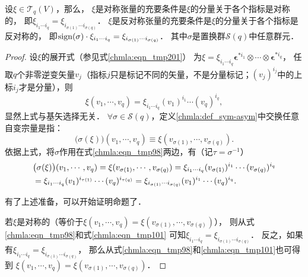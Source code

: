 \begin{proposition}\label{chmla:thm_component-sym-asym}
    设$\xi \in \mathcal{T}_q(V)$，那么，
    $\xi$是对称张量的充要条件是$\xi$的分量关于各个指标是对称的，
    即$\xi_{i_1\cdots i_q}=\xi_{i_{\sigma(1)}\cdots i_{\sigma(q)}}$．
    $\xi$是反对称张量的充要条件是$\xi$的分量关于各个指标是反对称的，
    即${\rm sign}(\sigma) \cdot \xi_{i_1\cdots i_q}= \xi_{i_{\sigma(1)}\cdots i_{\sigma(q)}}$．
    其中$\sigma$是置换群$\mathscr{S}(q)$中任意群元．
\end{proposition}
\begin{proof}
    设$\xi$的展开式（参见式\eqref{chmla:eqn_tmp201}）
    为$\xi = \xi_{i_1 \cdots i_q} \boldsymbol{\epsilon}^{*i_1} \otimes\cdots\otimes \boldsymbol{\epsilon}^{*i_q}$，
    任取$q$个非零逆变矢量$v_j$（指标$j$只是标记不同的矢量，不是分量标记；$(v_j)^{i_j}$中的上标$i_j$才是分量），则
    \begin{equation}\label{chmla:eqn_tmp98}
        \xi(v_1,\cdots,v_q)= \xi_{i_1 \cdots i_q} (v_1)^{i_1}\cdots (v_q)^{i_q},
    \end{equation}
    显然上式与基矢选择无关．
    $\forall \sigma \in \mathscr{S}(q)$，定义\ref{chmla:def_sym-asym}中交换任意自变宗量是指：
    \begin{equation}\label{chmla:eqn_tmp99}
        \bigl(\sigma(\xi)\bigr)(v_1,\cdots,v_q) \equiv
          \xi( v_{\sigma(1)},\cdots, v_{\sigma(q)}) .
    \end{equation}
    依据上式，将$\sigma$作用在式\eqref{chmla:eqn_tmp98}两边，有（记$\tau = \sigma^{-1}$）
    \begin{align}
        &\bigl(\sigma(\xi)\bigr)(v_1,\cdots,v_q)  =
        \xi( v_{\sigma(1)},\cdots, v_{\sigma(q)})
        =\xi_{i_1 \cdots i_q} (v_{\sigma(1)})^{i_1}\cdots (v_{\sigma(q)})^{i_q} \notag \\
       &=\xi_{i_1 \cdots i_q} (v_{1})^{i_{\tau(1)}}\cdots (v_{q})^{i_{\tau(q)}}
        =\xi_{i_{\sigma(1)} \cdots i_{\sigma(q)}} (v_{1})^{i_{1}}\cdots (v_{q})^{i_{q}} .
         \label{chmla:eqn_tmp101}
    \end{align}

    有了上述准备，可以开始证明命题了．

    若$\xi$是对称的（等价于$\xi(v_1,\cdots,v_q)=\xi( v_{\sigma(1)},\cdots, v_{\sigma(q)})$），
    则从式\eqref{chmla:eqn_tmp98}和式\eqref{chmla:eqn_tmp101}
    可知$\xi_{i_1 \cdots i_q}=\xi_{i_{\sigma(1)} \cdots i_{\sigma(q)}}$．
    反之，如果有$\xi_{i_1 \cdots i_q}=\xi_{i_{\sigma(1)} \cdots i_{\sigma(q)}}$，
    那么从式\eqref{chmla:eqn_tmp98}和\eqref{chmla:eqn_tmp101}也可得到
    $\xi(v_1,\cdots,v_q)=\xi( v_{\sigma(1)},\cdots, v_{\sigma(q)})$．


\end{proof}
